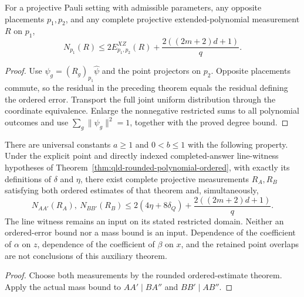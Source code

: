 \begin{theorem}
\label{thm:qld-actual-scalar-nonlinear-mass}
\leanok
For a projective Pauli setting with admissible parameters, any opposite
placements $p_1,p_2$, and any complete projective extended-polynomial
measurement $R$ on $p_1$,
\[
 N_{p_1}(R)\leq2E^{XZ}_{p_1,p_2}(R)+\frac{2((2m+2)d+1)}q.
\]
\end{theorem}
\begin{proof}
\leanok
{}
Use $\psi_g=(R_g)_{p_1}\hat\psi$ and the point projectors on $p_2$.
Opposite placements commute, so the residual in the preceding theorem
equals the residual defining the ordered error. Transport the full joint
uniform distribution through the coordinate equivalence. Enlarge the
nonnegative restricted sums to all polynomial outcomes and use
$\sum_g\|\psi_g\|^2=1$, together with the proved degree bound.
\end{proof}

\begin{theorem}
\label{thm:qld-rounded-scalar-linearity}
\leanok
There are universal constants $a\geq1$ and $0<b\leq1$ with the following
property. Under the explicit point and directly indexed completed-answer
line-witness hypotheses of Theorem~\ref{thm:qld-rounded-polynomial-ordered},
with exactly its definitions of $\delta$ and $\eta$, there exist complete
projective measurements $R_A,R_B$ satisfying both ordered estimates of
that theorem and, simultaneously,
\[
 N_{AA'}(R_A),\ N_{BB'}(R_B)
 \leq 2(4\eta+8\delta_Q)+\frac{2((2m+2)d+1)}q.
\]
The line witness remains an input on its stated restricted domain.
Neither an ordered-error bound nor a mass bound is an input.
Dependence of the coefficient of $\alpha$ on $z$, dependence of the
coefficient of $\beta$ on $x$, and the retained point overlaps are not
conclusions of this auxiliary theorem.
\end{theorem}
\begin{proof}
\leanok
{}
Choose both measurements by the rounded ordered-estimate theorem.
Apply the actual mass bound to $AA'\mid BA''$ and $BB'\mid AB''$.
\end{proof}

